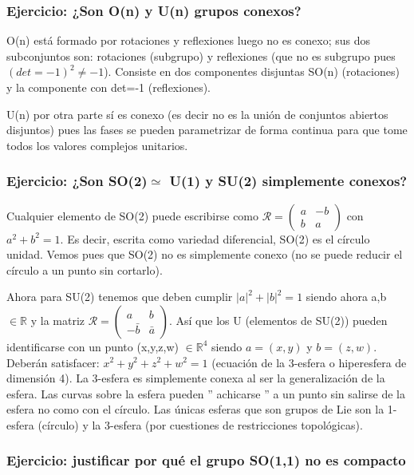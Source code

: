 \subsubsection{Ejercicio: ¿Son O(n) y U(n) grupos conexos?}

O(n) está formado por rotaciones y reflexiones luego no es conexo; sus dos subconjuntos son: rotaciones (subgrupo) y reflexiones (que no es subgrupo pues $(det=-1)^2 \neq -1$). Consiste en dos componentes disjuntas SO(n) (rotaciones) y la componente con det=-1 (reflexiones).

\smallskip
U(n) por otra parte sí es conexo (es decir no es la unión de conjuntos abiertos disjuntos) pues las fases se pueden parametrizar de forma continua para que tome todos los valores complejos unitarios.

\subsubsection{Ejercicio: ¿Son SO(2)$\simeq $
U(1) y SU(2) simplemente conexos?}

Cualquier elemento de SO(2) puede escribirse como $\mathcal{R}= \left ( \begin{array}{cc}
a &  -b\\
b & a
\end{array}\right)$ con $a^2+b^2=1$. Es decir, escrita como variedad diferencial, SO(2) es el círculo unidad. Vemos pues que SO(2) no es simplemente conexo (no se puede reducir el círculo a un punto sin cortarlo).

\bigskip
Ahora para SU(2) tenemos que deben cumplir $|a|^2+|b|^2=1$ siendo ahora a,b $\in \mathds{R}$ y la matriz $\mathcal{R}= \left ( \begin{array}{cc}
a &  b\\
-\bar{b} & \bar{a}
\end{array}\right)$. Así que los U (elementos de SU(2)) pueden identificarse con un punto (x,y,z,w) $\in \mathds{R}^4$ siendo $a=(x,y)$ y $b=(z,w)$. Deberán satisfacer: $x^2 +y^2 + z^2 + w^2=1$ (ecuación de la 3-esfera o hiperesfera de dimensión 4). La 3-esfera es simplemente conexa al ser la generalización de la esfera. Las curvas sobre la esfera pueden '' achicarse '' a un punto sin salirse de la esfera no como con el círculo. Las únicas esferas que son grupos de Lie son la 1-esfera (círculo) y la 3-esfera (por cuestiones de restricciones topológicas).

\newpage
\subsubsection{Ejercicio: justificar por qué el grupo SO(1,1) no es compacto}

